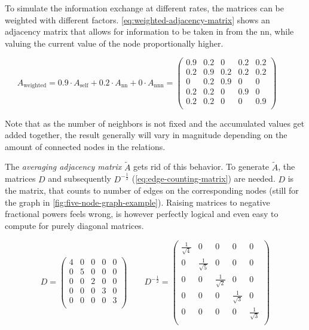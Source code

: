 To simulate the information exchange at different rates, the matrices can be weighted with different factors. 
\autoref{eq:weighted-adjacency-matrix} shows an adjacency matrix that allows for information to be taken in from the nn, while valuing the current value of the node proportionally higher. 

\begin{equation}
    \label{eq:weighted-adjacency-matrix}
    A_\mathrm{weighted} = 0.9 \cdot A_\mathrm{self} + 0.2 \cdot A_\mathrm{nn} + 0 \cdot A_\mathrm{nnn} = 
    \left(\begin{matrix}
        0.9 & 0.2 & 0 & 0.2 & 0.2 \\
        0.2 & 0.9 & 0.2 & 0.2 & 0.2 \\
        0 & 0.2 & 0.9 & 0 & 0 \\
        0.2 & 0.2 & 0 & 0.9 & 0 \\
        0.2 & 0.2 & 0 & 0 & 0.9 \\
    \end{matrix}\right)\qquad
\end{equation}

Note that as the number of neighbors is not fixed and the accumulated values get added together, the result generally will vary in magnitude depending on the amount of connected nodes in the relations.

The \emph{averaging adjacency matrix} $\tilde{A}$ gets rid of this behavior.
To generate $\tilde{A}$, the matrices $D$ and subsequently $D^{-\frac{1}{2}}$ (\autoref{eq:edge-counting-matrix}) are needed. 
$D$ is the matrix, that counts to number of edges on the corresponding nodes (still for the graph in \autoref{fig:five-node-graph-example}).
Raising matrices to negative fractional powers feels wrong, is however perfectly logical and even easy to compute for purely diagonal matrices. 

\begin{equation}
    \label{eq:edge-counting-matrix}
    D = \left(\begin{matrix}
        4 & 0 & 0 & 0 & 0 \\
        0 & 5 & 0 & 0 & 0 \\
        0 & 0 & 2 & 0 & 0 \\
        0 & 0 & 0 & 3 & 0 \\
        0 & 0 & 0 & 0 & 3 \\
    \end{matrix}\right)\qquad
    D^{-\frac{1}{2}} = \left(\begin{matrix}
        \frac{1}{\sqrt{4}} & 0 & 0 & 0 & 0 \\
        0 & \frac{1}{\sqrt{5}} & 0 & 0 & 0 \\
        0 & 0 & \frac{1}{\sqrt{2}} & 0 & 0 \\
        0 & 0 & 0 & \frac{1}{\sqrt{3}} & 0 \\
        0 & 0 & 0 & 0 & \frac{1}{\sqrt{3}} \\
    \end{matrix}\right)
\end{equation}

